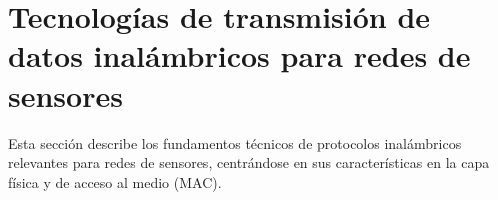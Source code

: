 \section{Tecnologías de transmisión de datos inalámbricos para redes de sensores}
Esta sección describe los fundamentos técnicos de protocolos inalámbricos relevantes para redes de sensores, centrándose en sus características en la capa física y de acceso al medio (MAC).

